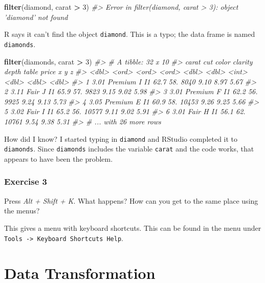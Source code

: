 \documentclass[]{book}
\newenvironment{Shaded}{\begin{snugshade}}{\end{snugshade}}
\newcommand{\CommentTok}[1]{\textcolor[rgb]{0.56,0.35,0.01}{\textit{#1}}}
\newcommand{\DecValTok}[1]{\textcolor[rgb]{0.00,0.00,0.81}{#1}}
\newcommand{\KeywordTok}[1]{\textcolor[rgb]{0.13,0.29,0.53}{\textbf{#1}}}
\newcommand{\NormalTok}[1]{#1}
\newcommand{\OperatorTok}[1]{\textcolor[rgb]{0.81,0.36,0.00}{\textbf{#1}}}
\newcommand{\StringTok}[1]{\textcolor[rgb]{0.31,0.60,0.02}{#1}}
\theoremstyle{definition}
\theoremstyle{definition}
\theoremstyle{definition}
\theoremstyle{remark}
\begin{document}
\begin{Shaded}
\begin{Highlighting}[]
\KeywordTok{filter}\NormalTok{(diamond, carat }\OperatorTok{>}\StringTok{ }\DecValTok{3}\NormalTok{)}
\CommentTok{#> Error in filter(diamond, carat > 3): object 'diamond' not found}
\end{Highlighting}
\end{Shaded}

R says it can't find the object \texttt{diamond}. This is a typo; the
data frame is named \texttt{diamonds}.

\begin{Shaded}
\begin{Highlighting}[]
\KeywordTok{filter}\NormalTok{(diamonds, carat }\OperatorTok{>}\StringTok{ }\DecValTok{3}\NormalTok{)}
\CommentTok{#> # A tibble: 32 x 10}
\CommentTok{#>   carat cut     color clarity depth table price     x     y     z}
\CommentTok{#>   <dbl> <ord>   <ord> <ord>   <dbl> <dbl> <int> <dbl> <dbl> <dbl>}
\CommentTok{#> 1  3.01 Premium I     I1       62.7   58.  8040  9.10  8.97  5.67}
\CommentTok{#> 2  3.11 Fair    J     I1       65.9   57.  9823  9.15  9.02  5.98}
\CommentTok{#> 3  3.01 Premium F     I1       62.2   56.  9925  9.24  9.13  5.73}
\CommentTok{#> 4  3.05 Premium E     I1       60.9   58. 10453  9.26  9.25  5.66}
\CommentTok{#> 5  3.02 Fair    I     I1       65.2   56. 10577  9.11  9.02  5.91}
\CommentTok{#> 6  3.01 Fair    H     I1       56.1   62. 10761  9.54  9.38  5.31}
\CommentTok{#> # ... with 26 more rows}
\end{Highlighting}
\end{Shaded}

How did I know? I started typing in \texttt{diamond} and RStudio
completed it to \texttt{diamonds}. Since \texttt{diamonds} includes the
variable \texttt{carat} and the code works, that appears to have been
the problem.

\hypertarget{exercise-3}{%
\subsection{Exercise 3}\label{exercise-3}}

Press \emph{Alt + Shift + K}. What happens? How can you get to the same
place using the menus?

This gives a menu with keyboard shortcuts. This can be found in the menu
under \texttt{Tools\ -\textgreater{}\ Keyboard\ Shortcuts\ Help}.

\hypertarget{data-transformation}{%
\chapter{Data Transformation}\label{data-transformation}}
\end{document}
